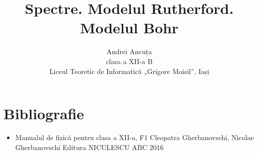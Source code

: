 \documentclass[a4paper, 12pt]{article}
\title{Spectre. Modelul Rutherford. Modelul Bohr}
\author{Andrei Ancuța \\ clasa a XII-a B \\
Liceul Teoretic de Informatică „Grigore Moisil”, Iași}
\def\\{}%
\newcommand{\mktitle}{%
    \noindent
    {\small\theauthor}

    \begin{center}
        \LARGE\thetitle
    \end{center}
}
\begin{document}
\mktitle
\tableofcontents

\clearpage




\clearpage

\section*{Bibliografie}
\begin{itemize}
    \item Manualul de fizică pentru clasa a XII-a, F1 \\
        Cleopatra Gherbanovschi, Nicolae Gherbanovschi \\
        Editura NICULESCU ABC \\
        2016
\end{itemize}
\end{document}
